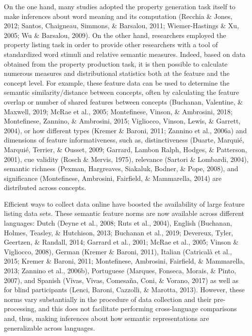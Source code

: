 \documentclass[man]{apa6}
\begin{document}
On the one hand, many studies adopted the property generation task itself to make inferences about word meaning and its computation (Recchia \& Jones, 2012; Santos, Chaigneau, Simmons, \& Barsalou, 2011; Wiemer-Hastings \& Xu, 2005; Wu \& Barsalou, 2009). On the other hand, researchers employed the property listing task in order to provide other researchers with a tool of standardized word stimuli and relative semantic measures. Indeed, based on data obtained from the property production task, it is then possible to calculate numerous measures and distributional statistics both at the feature and the concept level. For example, these feature data can be used to determine the semantic similarity/distance between concepts, often by calculating the feature overlap or number of shared features between concepts (Buchanan, Valentine, \& Maxwell, 2019; McRae et al., 2005; Montefinese, Vinson, \& Ambrosini, 2018; Montefinese, Zannino, \& Ambrosini, 2015; Vigliocco, Vinson, Lewis, \& Garrett, 2004), or how different types (Kremer \& Baroni, 2011; Zannino et al., 2006a) and dimensions of feature informativeness, such as, distinctiveness (Duarte, Marquié, Marquié, Terrier, \& Ousset, 2009; Garrard, Lambon Ralph, Hodges, \& Patterson, 2001), cue validity (Rosch \& Mervis, 1975), relevance (Sartori \& Lombardi, 2004), semantic richness (Pexman, Hargreaves, Siakaluk, Bodner, \& Pope, 2008), and significance (Montefinese, Ambrosini, Fairfield, \& Mammarella, 2014) are distributed across concepts.

Efficient ways to collect data online have boosted the availability of large feature listing data sets. These semantic feature norms are now available across different languages: Dutch (Deyne et al., 2008; Ruts et al., 2004), English (Buchanan, Holmes, Teasley, \& Hutchison, 2013; Buchanan et al., 2019; Devereux, Tyler, Geertzen, \& Randall, 2014; Garrard et al., 2001; McRae et al., 2005; Vinson \& Vigliocco, 2008), German (Kremer \& Baroni, 2011), Italian (Catricalà et al., 2015; Kremer \& Baroni, 2011; Montefinese, Ambrosini, Fairfield, \& Mammarella, 2013; Zannino et al., 2006b), Portuguese (Marques, Fonseca, Morais, \& Pinto, 2007), and Spanish (Vivas, Vivas, Comesaña, Coni, \& Vorano, 2017) as well as for blind participants (Lenci, Baroni, Cazzolli, \& Marotta, 2013). However, these norms vary substantially in the procedure of data collection and their pre-processing, and this does not facilitate performing cross-language comparisons and, thus, making inferences about how semantic representations are generalizable across languages.
\end{document}
